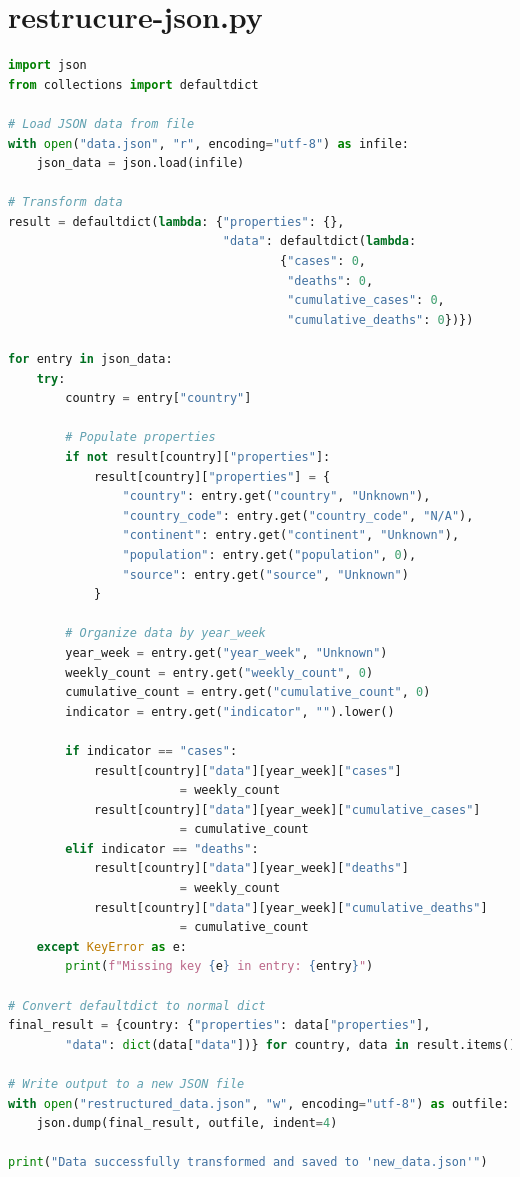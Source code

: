 \documentclass{report}
\begin{document}
\section{restrucure-json.py}
\begin{lstlisting}[language=Python]
import json
from collections import defaultdict

# Load JSON data from file
with open("data.json", "r", encoding="utf-8") as infile:
    json_data = json.load(infile)

# Transform data
result = defaultdict(lambda: {"properties": {},
                              "data": defaultdict(lambda:
                                      {"cases": 0,
                                       "deaths": 0,
                                       "cumulative_cases": 0,
                                       "cumulative_deaths": 0})})

for entry in json_data:
    try:
        country = entry["country"]
        
        # Populate properties
        if not result[country]["properties"]:
            result[country]["properties"] = {
                "country": entry.get("country", "Unknown"),
                "country_code": entry.get("country_code", "N/A"),
                "continent": entry.get("continent", "Unknown"),
                "population": entry.get("population", 0),
                "source": entry.get("source", "Unknown")
            }

        # Organize data by year_week
        year_week = entry.get("year_week", "Unknown")
        weekly_count = entry.get("weekly_count", 0)
        cumulative_count = entry.get("cumulative_count", 0)
        indicator = entry.get("indicator", "").lower()

        if indicator == "cases":
            result[country]["data"][year_week]["cases"]
                        = weekly_count
            result[country]["data"][year_week]["cumulative_cases"]
                        = cumulative_count
        elif indicator == "deaths":
            result[country]["data"][year_week]["deaths"]
                        = weekly_count
            result[country]["data"][year_week]["cumulative_deaths"]
                        = cumulative_count
    except KeyError as e:
        print(f"Missing key {e} in entry: {entry}")

# Convert defaultdict to normal dict
final_result = {country: {"properties": data["properties"],
        "data": dict(data["data"])} for country, data in result.items()}

# Write output to a new JSON file
with open("restructured_data.json", "w", encoding="utf-8") as outfile:
    json.dump(final_result, outfile, indent=4)

print("Data successfully transformed and saved to 'new_data.json'")
\end{lstlisting}


\newpage
\end{document}
